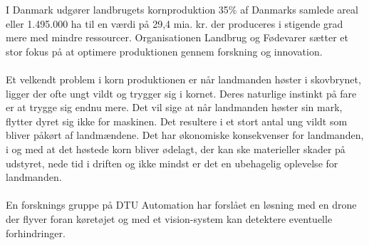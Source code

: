I Danmark udgører landbrugets kornproduktion 35\% af Danmarks samlede areal eller 1.495.000 ha til en værdi på 29,4 mia. kr. der produceres i stigende grad mere med mindre ressourcer. Organisationen Landbrug og Fødevarer sætter et stor fokus på at optimere produktionen gennem forskning og innovation.
\\
\\
Et velkendt problem i korn produktionen er når landmanden høster i skovbrynet, ligger der ofte ungt vildt og trygger sig i kornet. Deres naturlige instinkt på fare er at trygge sig endnu mere. Det vil sige at når landmanden høster sin mark, flytter dyret sig ikke for maskinen. Det resultere i et stort antal ung vildt som bliver påkørt af landmændene. Det har økonomiske konsekvenser for landmanden, i og med at det høstede korn bliver ødelagt, der kan ske materieller skader på udstyret, nede tid i driften og ikke mindst er det en ubehagelig oplevelse for landmanden.
\\
\\
En forsknings gruppe på DTU Automation har forslået en løsning med en drone der flyver foran køretøjet og med et vision-system kan detektere eventuelle forhindringer.
\\


